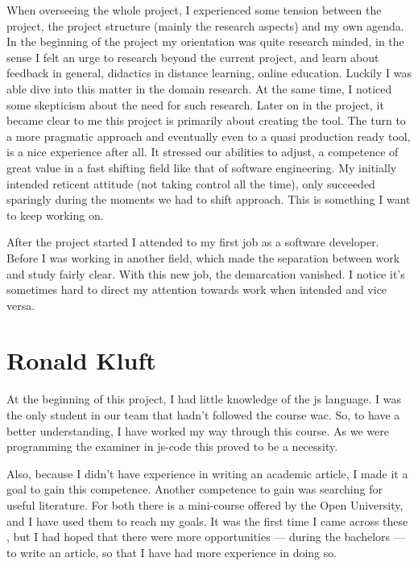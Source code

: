 When overseeing the whole project, I experienced some tension between the
project, the project structure (mainly the research aspects) and my own agenda.
In the beginning of the project my orientation was quite research minded, in the
sense I felt an urge to research beyond the current project, and learn about 
feedback in general, didactics in distance learning, online education. Luckily
I was able dive into this matter in the domain research. At the same time, I
noticed some skepticism about the need for such research. Later on in the 
project, it became clear to me this project is primarily about creating the 
tool. The turn to a more pragmatic approach and eventually even to a quasi 
production ready tool, is a nice experience after all. It stressed our 
abilities to adjust, a competence of great value in a fast shifting field like 
that of software engineering. My initially intended reticent attitude 
(not taking control all the time), only succeeded sparingly during the moments 
we had to shift approach. This is something I want to keep working on.

After the project started I attended to my first job as a software developer. 
Before I was working in another field, which made the separation between work 
and study fairly clear. With this new job, the demarcation vanished. I notice 
it's sometimes hard to direct my attention towards work when intended and vice 
versa. 


\section{Ronald Kluft}

At the beginning of this project, I had little knowledge of the \gls{js}
language. I was the only student in our team that hadn't followed the course
\gls{wac}. So, to have a better understanding, I have worked my way through
this course.
As we were programming the \gls{examiner} in \gls{js-code} this proved to be a 
necessity.

Also, because I didn't have experience in writing an academic article, I
made it a goal to gain this competence.
Another competence to gain was searching for useful literature.
For both there is a mini-course offered by the Open University, and I have
used them to reach my goals.
It was the first time I came across these , but I had hoped that there were
more opportunities --- during the bachelors --- to write an article, so that I 
have had more experience in doing so.

